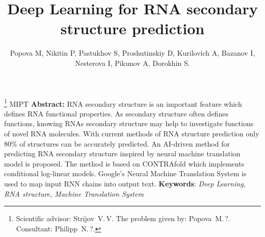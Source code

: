 \documentclass[12pt,twoside]{article}
\begin{document}
\title
{Deep Learning for RNA secondary structure prediction}
\author
[Popova M, Nikitin P, Pastukhov S, Proshutinskiy D, Kurilovich A, Bazanov I, Nesterova I, Pikunov A, Dorokhin S.] %
{Popova M, Nikitin P, Pastukhov S, Proshutinskiy D, Kurilovich A, Bazanov I, Nesterova I, Pikunov A, Dorokhin S.} %
\thanks
{Scientific advisor:  Strijov~V.\,V.
The problem given by:  Popova~M.\,?.
Consultant: Philipp~N.\,?.}
\organization
{MIPT}
\abstract
{
    \textbf{Abstract:}
        RNA secondary structure is an important feature which defines RNA functional properties. As secondary structure often defines functions, knowing RNAs secondary structure may help to investigate functions of novel RNA molecules. With current methods of RNA structure prediction only 80\% of structures can be accurately predicted. An AI-driven method for predicting RNA secondary structure inspired by neural machine translation model is proposed. The method is based on CONTRAfold which implements conditional log-linear models. Google's Neural Machine Translation System is used to map input RNN chains into output text. 
\bigskip
\textbf{Keywords}: \emph {Deep Learning, RNA structure, Machine Translation System}
}
\maketitle
\end{document}
